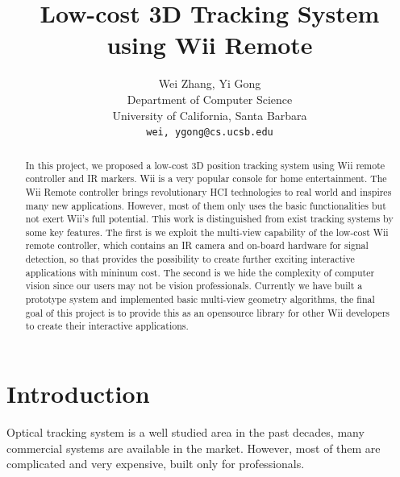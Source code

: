 \documentclass[10pt,twocolumn,letterpaper]{article}
\begin{document}
\title{Low-cost 3D Tracking System using Wii Remote}

\author{Wei Zhang, Yi Gong\\
Department of Computer Science\\
University of California, Santa Barbara\\
{\tt\small wei, ygong@cs.ucsb.edu}\\
}

\maketitle
\thispagestyle{empty}

\begin{abstract}
In this project, we proposed a low-cost 3D position tracking system using 
Wii remote controller and IR markers. 
Wii is a very popular console for home entertainment. 
The Wii Remote controller brings revolutionary HCI technologies
to real world and inspires many new applications. However, most of
them only uses the basic functionalities but not exert Wii's full potential.
This work is distinguished from exist
tracking systems by some key features. The first is we exploit the 
multi-view capability of the low-cost Wii remote controller, 
which contains an IR camera and on-board
hardware for signal detection, so that provides the possibility to create
further exciting interactive applications with mininum cost. 
The second is we hide the complexity of computer vision 
since our users may not be vision professionals. 
Currently we have built 
a prototype system and implemented basic multi-view geometry algorithms, 
the final goal of this project is to provide this as an opensource library for other 
Wii developers to create their interactive applications.
\end{abstract}
\section{Introduction}
Optical tracking system is a well studied area in the past decades, 
many commercial systems are available in the market. However, most of them 
are complicated and very expensive, built only for professionals.
\end{document}
